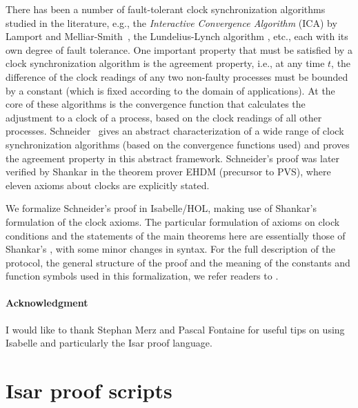 \documentclass[11pt,a4paper]{article}
\begin{document}
There has been a number of fault-tolerant clock synchronization
algorithms studied in the literature, e.g., the {\em Interactive
  Convergence Algorithm} ({ICA}) by Lamport and
Melliar-Smith~\cite{Lamport}, the Lundelius-Lynch algorithm
\cite{Lundelius}, etc., each with its own degree of fault tolerance.
One important property that must be satisfied by a clock
synchronization algorithm is the agreement property, i.e., at any time
$t$, the difference of the clock readings of any two non-faulty processes must be
bounded by a constant (which is fixed according to the domain of
applications).  At the core of these algorithms is the convergence
function that calculates the adjustment to a clock of a process, based
on the clock readings of all other processes.
Schneider~\cite{Schneider87} gives an abstract
characterization of a wide range of clock synchronization algorithms
(based on the convergence functions used) and proves the agreement
property in this abstract framework.  Schneider's proof was later
verified by Shankar \cite{Shankar92} in the theorem prover EHDM
(precursor to PVS), where eleven axioms about clocks are explicitly stated. 

We formalize Schneider's proof in Isabelle/HOL, making use of Shankar's formulation of the
clock axioms. The particular formulation of axioms on clock
conditions and the statements of the main theorems here are
essentially those of Shankar's \cite{Shankar92}, with some minor
changes in syntax. For the full description of the protocol, the
general structure of the proof and the meaning of the constants and
function symbols used in this formalization, we refer readers to \cite{Shankar92}.

\paragraph{Acknowledgment} 
I would like to thank Stephan Merz and Pascal Fontaine for useful tips on using Isabelle
and particularly the Isar proof language.
 
\section{Isar proof scripts}





\end{document}
